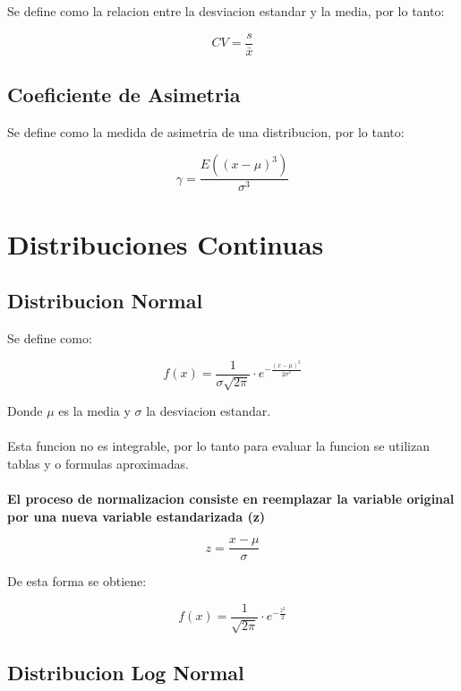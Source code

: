 Se define como la relacion entre la desviacion estandar y la media, por lo tanto:

\begin{equation}
    CV = \frac{s}{\bar{x}}
\end{equation}

\subsection{Coeficiente de Asimetria}

Se define como la medida de asimetria de una distribucion, por lo tanto:

\begin{equation}
    \gamma = \frac{E((x-\mu)^3)}{\sigma^3}
\end{equation}

\section{Distribuciones Continuas}

\subsection{Distribucion Normal}

Se define como:

\begin{equation}
    f(x) = \frac{1}{\sigma\sqrt{2\pi}} \cdot e^{-\frac{(x-\mu)^2}{2\sigma^2}}
\end{equation}

Donde $\mu$ es la media y $\sigma$ la desviacion estandar.
\\ \\
Esta funcion no es integrable, por lo tanto para evaluar la funcion se utilizan tablas y o formulas aproximadas.
\\ \\
\textbf{El proceso de normalizacion consiste en reemplazar la variable original por una nueva variable estandarizada (z) }

\begin{equation}
    z = \frac{x-\mu}{\sigma}
\end{equation}

De esta forma se obtiene:

\begin{equation}
    f(x) = \frac{1}{\sqrt{2\pi}} \cdot e^{-\frac{z^2}{2}}
\end{equation}

\subsection{Distribucion Log Normal}

